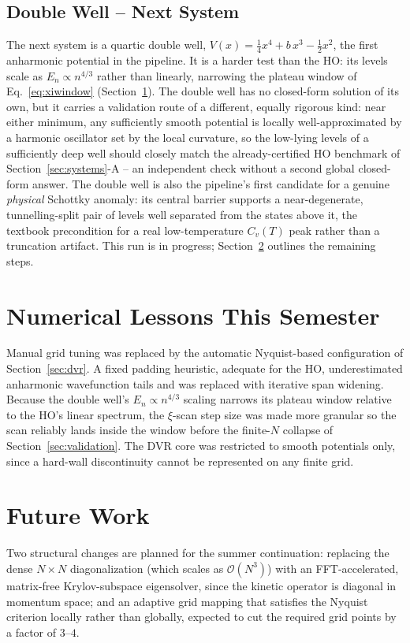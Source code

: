 \documentclass[10pt,conference]{IEEEtran}
\begin{document}
\subsection{Double Well -- Next System}
The next system is a quartic double well, $V(x) = \tfrac14 x^4 + b\,x^3 - \tfrac12 x^2$, the first anharmonic potential in the pipeline. It is a harder test than the HO: its levels scale as $E_n\propto n^{4/3}$ rather than linearly, narrowing the plateau window of Eq.~\eqref{eq:xiwindow} (Section~\ref{sec:history}). The double well has no closed-form solution of its own, but it carries a validation route of a different, equally rigorous kind: near either minimum, any sufficiently smooth potential is locally well-approximated by a harmonic oscillator set by the local curvature, so the low-lying levels of a sufficiently deep well should closely match the already-certified HO benchmark of Section~\ref{sec:systems}-A -- an independent check without a second global closed-form answer. The double well is also the pipeline's first candidate for a genuine \emph{physical} Schottky anomaly: its central barrier supports a near-degenerate, tunnelling-split pair of levels well separated from the states above it, the textbook precondition for a real low-temperature $C_v(T)$ peak rather than a truncation artifact. This run is in progress; Section~\ref{sec:future} outlines the remaining steps.

\section{Numerical Lessons This Semester}
\label{sec:history}
Manual grid tuning was replaced by the automatic Nyquist-based configuration of Section~\ref{sec:dvr}. A fixed padding heuristic, adequate for the HO, underestimated anharmonic wavefunction tails and was replaced with iterative span widening. Because the double well's $E_n\propto n^{4/3}$ scaling narrows its plateau window relative to the HO's linear spectrum, the $\xi$-scan step size was made more granular so the scan reliably lands inside the window before the finite-$N$ collapse of Section~\ref{sec:validation}. The DVR core was restricted to smooth potentials only, since a hard-wall discontinuity cannot be represented on any finite grid.

\section{Future Work}
\label{sec:future}
Two structural changes are planned for the summer continuation: replacing the dense $N\times N$ diagonalization (which scales as $\mathcal{O}(N^3)$) with an FFT-accelerated, matrix-free Krylov-subspace eigensolver, since the kinetic operator is diagonal in momentum space; and an adaptive grid mapping that satisfies the Nyquist criterion locally rather than globally, expected to cut the required grid points by a factor of $3$--$4$.
\end{document}
